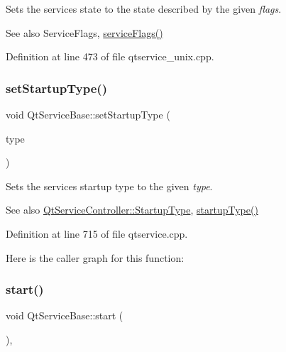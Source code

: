 Sets the service\textquotesingle{}s state to the state described by the given {\itshape flags}.

\begin{DoxySeeAlso}{See also}
Service\+Flags, \mbox{\hyperlink{class_qt_service_base_aab0b204981c481e098fe72061e3f367a}{service\+Flags()}} 
\end{DoxySeeAlso}


Definition at line 473 of file qtservice\+\_\+unix.\+cpp.

\mbox{\label{class_qt_service_base_a6beddd54c973c3a7d81075b2f3f80df2}} 
\subsubsection{\texorpdfstring{set\+Startup\+Type()}{setStartupType()}}
{\footnotesize\ttfamily void Qt\+Service\+Base\+::set\+Startup\+Type (\begin{DoxyParamCaption}\item[{\mbox{\hyperlink{class_qt_service_controller_a946ac2b079d9760503da923c2eaf0aac}{Qt\+Service\+Controller\+::\+Startup\+Type}}}]{type }\end{DoxyParamCaption})}

Sets the service\textquotesingle{}s startup type to the given {\itshape type}.

\begin{DoxySeeAlso}{See also}
\mbox{\hyperlink{class_qt_service_controller_a946ac2b079d9760503da923c2eaf0aac}{Qt\+Service\+Controller\+::\+Startup\+Type}}, \mbox{\hyperlink{class_qt_service_base_aa1b3bf9b7fc09777b422f49f7bcfbcbe}{startup\+Type()}} 
\end{DoxySeeAlso}


Definition at line 715 of file qtservice.\+cpp.

Here is the caller graph for this function\+:
\mbox{\label{class_qt_service_base_adbc0cd621b41bd3a6a1f62fda432e9e4}} 
\subsubsection{\texorpdfstring{start()}{start()}}
{\footnotesize\ttfamily void Qt\+Service\+Base\+::start (\begin{DoxyParamCaption}\item[{void}]{ }\end{DoxyParamCaption})\hspace{0.3cm}{\ttfamily [protected]}, {}}


